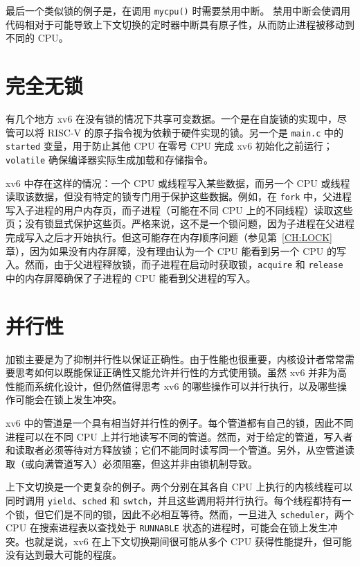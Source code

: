 最后一个类似锁的例子是，在调用 {\tt mycpu()}  时需要禁用中断。
禁用中断会使调用代码相对于可能导致上下文切换的定时器中断具有原子性，从而防止进程被移动到不同的 CPU。

\section{完全无锁}

有几个地方 xv6 在没有锁的情况下共享可变数据。一个是在自旋锁的实现中，尽管可以将 RISC-V 的原子指令视为依赖于硬件实现的锁。另一个是 {\tt main.c}  中的 {\tt started} 变量，用于防止其他 CPU 在零号 CPU 完成 xv6 初始化之前运行；{\tt volatile} 确保编译器实际生成加载和存储指令。

xv6 中存在这样的情况：一个 CPU 或线程写入某些数据，而另一个 CPU 或线程读取该数据，但没有特定的锁专门用于保护这些数据。例如，在 {\tt fork} 中，父进程写入子进程的用户内存页，而子进程（可能在不同 CPU 上的不同线程）读取这些页；没有锁显式保护这些页。严格来说，这不是一个锁问题，因为子进程在父进程完成写入之后才开始执行。但这可能存在内存顺序问题（参见第~\ref{CH:LOCK} 章），因为如果没有内存屏障，没有理由认为一个 CPU 能看到另一个 CPU 的写入。然而，由于父进程释放锁，而子进程在启动时获取锁，{\tt acquire} 和 {\tt release} 中的内存屏障确保了子进程的 CPU 能看到父进程的写入。

\section{并行性}

加锁主要是为了抑制并行性以保证正确性。由于性能也很重要，内核设计者常常需要思考如何以既能保证正确性又能允许并行性的方式使用锁。虽然 xv6 并非为高性能而系统化设计，但仍然值得思考 xv6 的哪些操作可以并行执行，以及哪些操作可能会在锁上发生冲突。

xv6 中的管道是一个具有相当好并行性的例子。每个管道都有自己的锁，因此不同进程可以在不同 CPU 上并行地读写不同的管道。然而，对于给定的管道，写入者和读取者必须等待对方释放锁；它们不能同时读写同一个管道。另外，从空管道读取（或向满管道写入）必须阻塞，但这并非由锁机制导致。

上下文切换是一个更复杂的例子。两个分别在其各自 CPU 上执行的内核线程可以同时调用 {\tt yield}、{\tt sched} 和 {\tt swtch}，并且这些调用将并行执行。每个线程都持有一个锁，但它们是不同的锁，因此不必相互等待。然而，一旦进入 {\tt scheduler}，两个 CPU 在搜索进程表以查找处于 {\tt RUNNABLE} 状态的进程时，可能会在锁上发生冲突。也就是说，xv6 在上下文切换期间很可能从多个 CPU 获得性能提升，但可能没有达到最大可能的程度。

